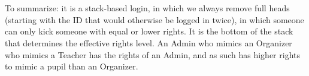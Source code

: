 \begin{section}
\\\\
To summarize: it is a stack-based login, in which we always remove full heads (starting with the ID that would otherwise be logged in twice), in which someone can only kick someone with equal or lower rights. It is the bottom of the stack that determines the effective rights level. An Admin who mimics an Organizer who mimics a Teacher has the rights of an Admin, and as such has higher rights to mimic a pupil than an Organizer.
\end{section}